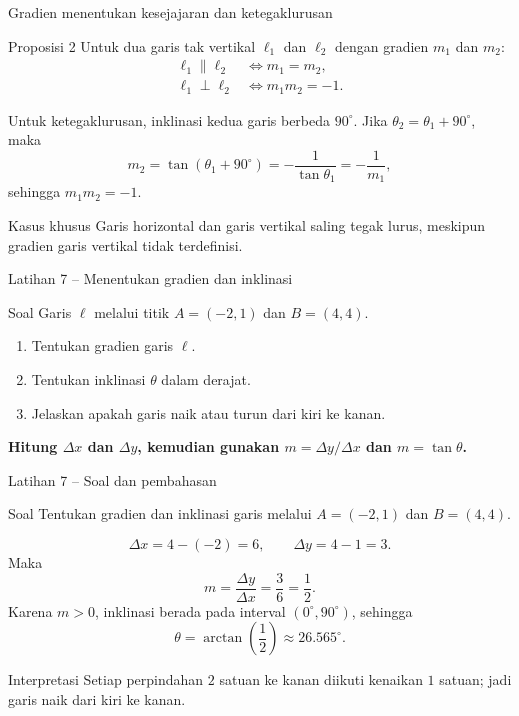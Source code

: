 \documentclass[aspectratio=169,11pt]{beamer}
\begin{document}
\begin{frame}[shrink=5]{Gradien menentukan kesejajaran dan ketegaklurusan}
	\begin{block}{Proposisi 2}
		Untuk dua garis tak vertikal $\ell_1$ dan $\ell_2$ dengan gradien
		$m_1$ dan $m_2$:
		\[
		\begin{aligned}
			\ell_1\parallel\ell_2 &\Longleftrightarrow m_1=m_2,\\
			\ell_1\perp\ell_2 &\Longleftrightarrow m_1m_2=-1.
		\end{aligned}
		\]
	\end{block}
	
	Untuk ketegaklurusan, inklinasi kedua garis berbeda $90^\circ$. Jika
	$\theta_2=\theta_1+90^\circ$, maka
	\[
	m_2=\tan(\theta_1+90^\circ)
	=-\frac{1}{\tan\theta_1}=-\frac1{m_1},
	\]
	sehingga $m_1m_2=-1$.
	
	\begin{alertblock}{Kasus khusus}
		Garis horizontal dan garis vertikal saling tegak lurus, meskipun
		gradien garis vertikal tidak terdefinisi.
	\end{alertblock}
\end{frame}

\begin{frame}{Latihan 7 -- Menentukan gradien dan inklinasi}
	\begin{block}{Soal}
		Garis $\ell$ melalui titik $A=(-2,1)$ dan $B=(4,4)$.
		\begin{enumerate}
			\item Tentukan gradien garis $\ell$.
			\item Tentukan inklinasi $\theta$ dalam derajat.
			\item Jelaskan apakah garis naik atau turun dari kiri ke kanan.
		\end{enumerate}
	\end{block}
	
	\vspace{0.35cm}
	\centering
	\color{AcademicBlue}\bfseries Hitung $\Delta x$ dan $\Delta y$, kemudian gunakan
	$m=\Delta y/\Delta x$ dan $m=\tan\theta$.
\end{frame}

\begin{frame}[shrink=7]{Latihan 7 -- Soal dan pembahasan}
	\begin{exampleblock}{Soal}
		Tentukan gradien dan inklinasi garis melalui $A=(-2,1)$ dan $B=(4,4)$.
	\end{exampleblock}
	
	\[
	\Delta x=4-(-2)=6,\qquad \Delta y=4-1=3.
	\]
	Maka
	\[
	m=\frac{\Delta y}{\Delta x}=\frac36=\boxed{\frac12}.
	\]
	Karena $m>0$, inklinasi berada pada interval $(0^\circ,90^\circ)$, sehingga
	\[
	\theta=\arctan\left(\frac12\right)
	\approx\boxed{26.565^\circ}.
	\]
	
	\begin{exampleblock}{Interpretasi}
		Setiap perpindahan $2$ satuan ke kanan diikuti kenaikan $1$ satuan;
		jadi garis naik dari kiri ke kanan.
	\end{exampleblock}
\end{frame}
\end{document}
